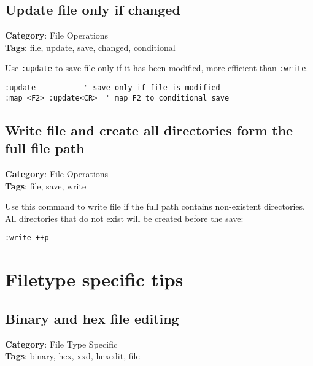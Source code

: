 {{{{{{\section{Update file only if changed}

\textbf{Category}: File Operations\\ \textbf{Tags}: file, update, save, changed, conditional
\vspace{0.5cm}

Use {\footnotesize \Verb§:update§} to save file only if it has been modified, more efficient than {\footnotesize \Verb§:write§}.

\begin{Exa*}{}
\begin{Verbatim}[fontsize=\footnotesize, breaklines, breakanywhere]
:update           " save only if file is modified
:map <F2> :update<CR>  " map F2 to conditional save
\end{Verbatim}
\end{Exa*}

\section{Write file and create all directories form the full file path}

\textbf{Category}: File Operations\\ \textbf{Tags}: file, save, write
\vspace{0.5cm}

Use this command to write file if the full path contains non-existent directories. All directories that do not exist will be created before the save:

\begin{Exa*}{}
\begin{Verbatim}[fontsize=\footnotesize, breaklines, breakanywhere]
:write ++p
\end{Verbatim}
\end{Exa*}

\chapter{Filetype specific tips}
\section{Binary and hex file editing}

\textbf{Category}: File Type Specific\\ \textbf{Tags}: binary, hex, xxd, hexedit, file
\vspace{0.5cm}

}}}}}}
